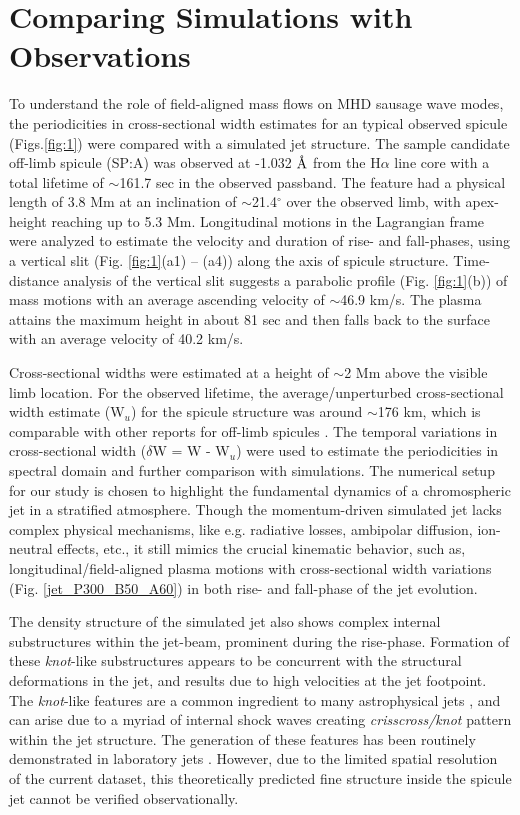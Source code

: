 \documentclass[12pt]{ociamthesis}
\newcommand{\angstrom}{\textup{\AA}}
\begin{document}
\section{Comparing Simulations with Observations}
To understand the role of field-aligned mass flows on MHD sausage wave modes, the periodicities in cross-sectional width estimates for an typical observed spicule (Figs.\ref{fig:1}) were compared with a simulated jet structure. The sample candidate off-limb spicule (SP:A) was observed at -1.032 $\angstrom$ from the H$\alpha$ line core with a total lifetime of $\sim$161.7 sec in the observed passband. The feature had a physical length of 3.8 Mm at an inclination of $\sim$21.4$^\circ$ over the observed limb, with apex-height reaching up to 5.3 Mm. Longitudinal motions in the Lagrangian frame were analyzed to estimate the velocity and duration of rise- and fall-phases, using a vertical slit (Fig. \ref{fig:1}(a1) – (a4)) along the axis of spicule structure. Time-distance analysis of the vertical slit suggests a parabolic profile (Fig. \ref{fig:1}(b)) of mass motions with an average ascending velocity of $\sim$46.9 km/s. The plasma attains the maximum height in about 81 sec and then falls back to the surface with an average velocity of 40.2 km/s. 

Cross-sectional widths were estimated at a height of $\sim$2 Mm above the visible limb location. For the observed lifetime, the average/unperturbed cross-sectional width estimate (W$_{u}$) for the spicule structure was around $\sim$176 km, which is comparable with other reports for off-limb spicules \citep{Sharma2018}. The temporal variations in cross-sectional width ($\delta$W = W - W$_{u}$) were used to estimate the periodicities in spectral domain and further comparison with simulations. The numerical setup for our study is chosen to highlight the fundamental dynamics of a chromospheric jet in a stratified atmosphere. Though the momentum-driven simulated jet lacks complex physical mechanisms, like e.g. radiative losses, ambipolar diffusion, ion-neutral effects, etc., it still mimics the crucial kinematic behavior, such as, longitudinal/field-aligned plasma motions with cross-sectional width variations (Fig. \ref{jet_P300_B50_A60}) in both rise- and fall-phase of the jet evolution. 

The density structure of the simulated jet also shows complex internal substructures within the jet-beam, prominent during the rise-phase. Formation of these \textit{knot}-like substructures appears to be concurrent with the structural deformations in the jet, and results due to high velocities at the jet footpoint. The \textit{knot}-like features are a common ingredient to many astrophysical jets \citep{Norman1982}, and can arise due to a myriad of internal shock waves creating \textit{crisscross/knot} pattern within the jet structure. The generation of these features has been routinely demonstrated in laboratory jets \citep{Menon2010ShWav20175M,Edgington_Mitchell2014,Ono2014}. However, due to the limited spatial resolution of the current dataset, this theoretically predicted fine structure inside the spicule jet cannot be verified observationally.
\end{document}
